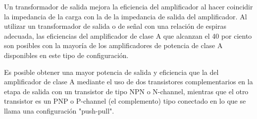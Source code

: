 \documentclass[12pt,a4paper]{article}
\begin{document}
Un transformador de salida mejora la eficiencia del amplificador al hacer coincidir la impedancia de la carga con la de la impedancia de salida del amplificador. Al utilizar un transformador de salida o de señal con una relación de espiras adecuada, las eficiencias del amplificador de clase A que alcanzan el 40 por ciento son posibles con la mayoría de los amplificadores de potencia de clase A disponibles en este tipo de configuración.\linebreak

Es posible obtener una mayor potencia de salida y eficiencia que la del amplificador de clase A mediante el uso de dos transistores complementarios en la etapa de salida con un transistor de tipo NPN o N-channel, mientras que el otro transistor es un PNP o P-channel (el complemento) tipo conectado en lo que se llama una configuración "push-pull".\\
\newpage
\end{document}
